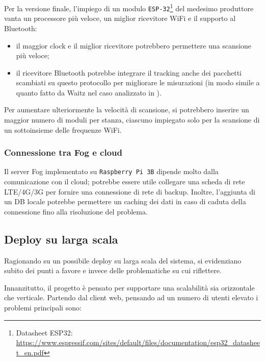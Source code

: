 Per la versione finale, l'impiego di un modulo \texttt{ESP-32}\footnote{Datasheet ESP32: \url{https://www.espressif.com/sites/default/files/documentation/esp32_datasheet_en.pdf}}
del medesimo produttore vanta un processore più veloce, un miglior ricevitore WiFi e il supporto al Bluetooth:
\begin{itemize}
  \item
    il maggior clock e il miglior ricevitore potrebbero permettere una scansione più veloce;
  \item
    il ricevitore Bluetooth potrebbe integrare il tracking anche dei pacchetti scambiati su questo protocollo per migliorare le misurazioni
    (in modo simile a quanto fatto da Waitz nel caso analizzato in ).
\end{itemize}

Per aumentare ulteriormente la velocità di scansione, si potrebbero inserire un maggior numero di moduli per stanza, ciascuno impiegato solo per la scansione di un sottoinsieme delle frequenze WiFi.

\subsubsection{Connessione tra Fog e cloud}

Il server Fog implementato su \texttt{Raspberry Pi 3B} dipende molto dalla comunicazione con il cloud;
potrebbe essere utile collegare una scheda di rete LTE/4G/3G per fornire una connessione di rete di backup.
Inoltre, l'aggiunta di un DB locale potrebbe permettere un caching dei dati in caso di caduta della connessione fino alla risoluzione del problema.

\subsection{Deploy su larga scala}

Ragionando su un possibile deploy su larga scala del sistema, si evidenziano subito dei punti a favore e invece delle problematiche su cui riflettere.

Innanzitutto, il progetto è pensato per supportare una scalabilità sia orizzontale che verticale.
Partendo dal client web, pensando ad un numero di utenti elevato i problemi principali sono:

